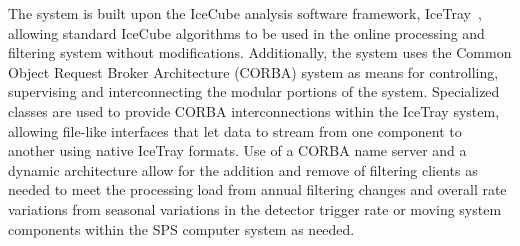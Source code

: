 The system is built upon the IceCube analysis software framework, IceTray~\cite{DeYoung:2005zz}, allowing standard IceCube algorithms to
be used in the online processing and filtering system without modifications.  Additionally, the system uses the 
Common Object Request Broker Architecture (CORBA) system as means for controlling, supervising and interconnecting
the modular portions of the system.  Specialized classes are used to provide CORBA interconnections
within the IceTray system, allowing file-like interfaces that let data to stream from one component to another
using native IceTray formats.  Use of a CORBA name server and a dynamic architecture allow for the
addition and remove of filtering clients as needed to meet the processing load from annual filtering
changes and overall rate variations from seasonal variations in the detector trigger rate or moving system components within the SPS
computer system as needed.

